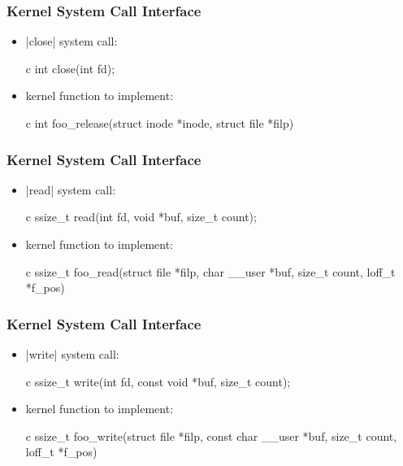 \documentclass[dvipsnames]{beamer}
\begin{document}
\begin{frame}[fragile]
  \frametitle{Kernel System Call Interface}

  \begin{itemize}
    \item {}|close| system call:
    \begin{pygments}{c}
int close(int fd);
    \end{pygments}

    \medskip
    \item kernel function to implement:
    \begin{pygments}{c}
int foo_release(struct inode *inode,
                struct file *filp)
    \end{pygments}
  \end{itemize}
\end{frame}

\begin{frame}[fragile]
  \frametitle{Kernel System Call Interface}

  \begin{itemize}
    \item {}|read| system call:
    \begin{pygments}{c}
ssize_t read(int fd,
             void *buf,
             size_t count);
    \end{pygments}

    \medskip
    \item kernel function to implement:
    \begin{pygments}{c}
ssize_t foo_read(struct file *filp,
                 char __user *buf,
                 size_t count,
                 loff_t *f_pos)
    \end{pygments}
  \end{itemize}
\end{frame}

\begin{frame}[fragile]
  \frametitle{Kernel System Call Interface}

  \begin{itemize}
    \item {}|write| system call:
    \begin{pygments}{c}
ssize_t write(int fd,
              const void *buf,
              size_t count);
    \end{pygments}

    \medskip
    \item kernel function to implement:
    \begin{pygments}{c}
ssize_t foo_write(struct file *filp,
                  const char __user *buf,
                  size_t count,
                  loff_t *f_pos)
    \end{pygments}
  \end{itemize}
\end{frame}
\end{document}
